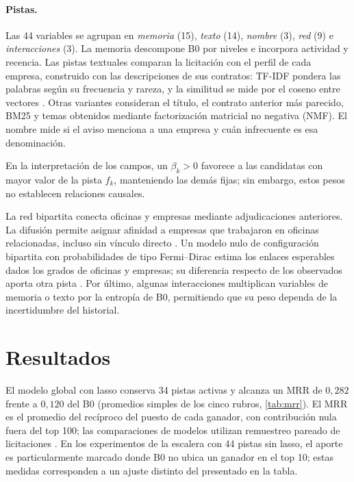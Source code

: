 \paragraph{Pistas.} Las 44 variables se agrupan en \emph{memoria} (15), \emph{texto} (14), \emph{nombre} (3), \emph{red} (9) e \emph{interacciones} (3). La memoria descompone B0 por niveles e incorpora actividad y recencia. Las pistas textuales comparan la licitación con el perfil de cada empresa, construido con las descripciones de sus contratos: TF-IDF pondera las palabras según su frecuencia y rareza, y la similitud se mide por el coseno entre vectores \cite{salton1988}. Otras variantes consideran el título, el contrato anterior más parecido, BM25 \cite{robertson2009} y temas obtenidos mediante factorización matricial no negativa (NMF). El nombre mide si el aviso menciona a una empresa y cuán infrecuente es esa denominación.

En la interpretación de los campos, un $\beta_k>0$ favorece a las candidatas con mayor valor de la pista $f_k$, manteniendo las demás fijas; sin embargo, estos pesos no establecen relaciones causales.

La red bipartita conecta oficinas y empresas mediante adjudicaciones anteriores. La difusión permite asignar afinidad a empresas que trabajaron en oficinas relacionadas, incluso sin vínculo directo \cite{zhou2007}. Un modelo nulo de configuración bipartita con probabilidades de tipo Fermi--Dirac estima los enlaces esperables dados los grados de oficinas y empresas; su diferencia respecto de los observados aporta otra pista \cite{park2004}. Por último, algunas interacciones multiplican variables de memoria o texto por la entropía de B0, permitiendo que su peso dependa de la incertidumbre del historial.

\section{Resultados}
El modelo global con lasso conserva 34 pistas activas y alcanza un MRR de $0{,}282$ frente a $0{,}120$ del B0 (promedios simples de los cinco rubros, \cref{tab:mrr}). El MRR es el promedio del recíproco del puesto de cada ganador, con contribución nula fuera del top 100; las comparaciones de modelos utilizan remuestreo pareado de licitaciones \cite{efron1993}. En los experimentos de la escalera con 44 pistas sin lasso, el aporte es particularmente marcado donde B0 no ubica un ganador en el top 10; estas medidas corresponden a un ajuste distinto del presentado en la tabla.

